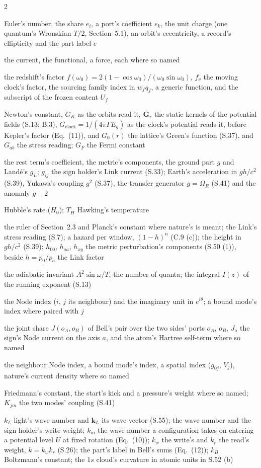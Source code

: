 \documentclass[pdflatex,sn-mathphys-num]{sn-jnl}
\newcommand{\nom}[2]{\item[{#1}] #2}
\theoremstyle{thmstyleone}
\begin{document}
\begin{multicols}{2}
\begin{description}[style=unboxed,leftmargin=0pt,itemsep=0pt,parsep=0pt,font=\normalfont]
\nom{$e$}{Euler's number, the share $e_i$, a port's coefficient $e_k$, the unit charge (one quantum's Wronskian $T / 2$, Section~5.1), an orbit's eccentricity, a record's ellipticity and the part label $e$}
\nom{$F$}{the current, the functional, a force, each where so named}
\nom{$f$}{the redshift's factor $f(\omega_0) = 2(1 - \cos\omega_0) / (\omega_0\sin\omega_0)$, $f_v$ the moving clock's factor, the sourcing family index in $w_f q_f$, a generic function, and the subscript of the frozen content $U_f$}
\nom{$G$}{Newton's constant, $G_K$ as the orbits read it, $\mathbf G_r$ the static kernels of the potential fields (S.13; B.3), $G_{\mathrm{clock}} = 1 / (4\pi\Gamma E_g)$ as the clock's potential reads it, before Kepler's factor (Eq.~(11)), and $G_0(r)$ the lattice's Green's function (S.37), and $G_{ab}$ the stress reading; $G_F$ the Fermi constant}
\nom{$g$}{the rest term's coefficient, the metric's components, the ground part $g$ and Land\'e's $g_L$; $g_{ij}$ the sign holder's Link current (S.33); Earth's acceleration in $gh / c^2$ (S.39), Yukawa's coupling $g^2$ (S.37), the transfer generator $g = \Omega_R$ (S.41) and the anomaly $g - 2$}
\nom{$H$}{Hubble's rate ($H_0$); $T_H$ Hawking's temperature}
\nom{$h$, $h_a(i)$}{the ruler of Section~2.3 and Planck's constant where nature's is meant; the Link's stress reading (S.7); a hazard per window, $(1 - h)^n$ (C.9 (c)); the height in $gh / c^2$ (S.39); $h_{00}$, $h_{aa}$, $h_{xy}$ the metric perturbation's components (S.50 (1)), beside $h = p_0 / p_a$ the Link factor}
\nom{$I$}{the adiabatic invariant $A^2\sin\omega / T$, the number of quanta; the integral $I(z)$ of the running exponent (S.13)}
\nom{$i$}{the Node index ($i$, $j$ its neighbour) and the imaginary unit in $e^{i\theta}$; a bound mode's index where paired with $j$}
\nom{$J$}{the joint share $J(o_A, o_B)$ of Bell's pair over the two sides' ports $o_A$, $o_B$, $J_a$ the sign's Node current on the axis $a$, and the atom's Hartree self-term where so named}
\nom{$j$}{the neighbour Node index, a bound mode's index, a spatial index ($g_{0j}$, $V_j$), nature's current density where so named}
\nom{$K$}{Friedmann's constant, the start's kick and a pressure's weight where so named; $K_{jm}$ the two modes' coupling (S.41)}
\nom{$k$}{$k_L$ light's wave number and $\mathbf k_L$ its wave vector (S.55); the wave number and the sign holder's write weight; $k_{\mathrm{in}}$ the wave number a configuration takes on entering a potential level $U$ at fixed rotation (Eq.~(10)); $k_w$ the write's and $k_r$ the read's weight, $k = k_w k_r$ (S.26); the part's label in Bell's sums (Eq.~(12)); $k_B$ Boltzmann's constant; the $1s$ cloud's curvature in atomic units in S.52 (b)}

\end{description}
\end{multicols}
\end{document}
